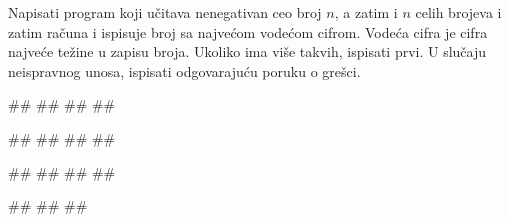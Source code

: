 \begin{Exercise}[label=PET_24] 
Napisati program koji učitava nenegativan ceo broj $n$, a zatim i $n$ celih
brojeva i zatim računa i ispisuje broj sa najvećom vodećom
cifrom. Vodeća cifra je cifra najveće težine u zapisu broja. Ukoliko
ima više takvih, ispisati prvi.
U slučaju neispravnog unosa, ispisati odgovarajuću poruku o grešci.

\begin{miditest}
\begin{upotreba}{1}
#\naslovInt#
##
##
##
\end{upotreba}
\end{miditest}
\begin{miditest}
\begin{upotreba}{2}
#\naslovInt#
##
##
##
\end{upotreba}
\end{miditest}

\begin{miditest}
\begin{upotreba}{3}
#\naslovInt#
##
##
##
\end{upotreba}
\end{miditest}
\begin{miditest}
\begin{upotreba}{4}
#\naslovInt#
##
##
\end{upotreba}
\end{miditest}

\end{Exercise}
\ifresenja
\begin{Answer}[ref=PET_24]
\end{Answer}
\fi


